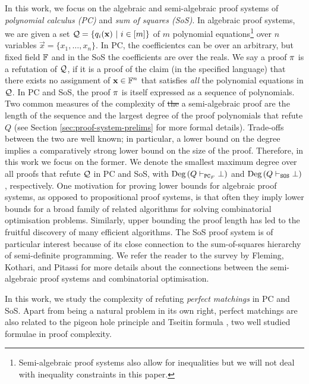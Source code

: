 \documentclass[11pt]{article}
\providecommand{\DIFadd}[1]{\textcolor{shin-ryoku}{#1}}%
\providecommand{\DIFdel}[1]{\textcolor{verylightgray}{\sout{#1}}}                      %
\providecommand{\DIFaddbegin}{} %
\providecommand{\DIFaddend}{} %
\providecommand{\DIFdelbegin}{} %
\providecommand{\DIFdelend}{} %
\begin{document}
In this work, we focus on the algebraic and semi-algebraic proof systems of \emph{polynomial calculus (PC)} and \emph{sum of squares (SoS)}. %
In algebraic proof systems, we are given a set $\mathcal{Q} =\{q_i(\mathbf{x}) \text{ } |\text{ } i \in [m] \}$ of $m$ polynomial equations\footnote{Semi-algebraic proof systems also allow for inequalities but we will not deal with inequality constraints in this paper.} over $n$ variables $\vec{x} = \{x_1, \dots, x_n\}$.
In PC, the coefficientcs can be over an arbitrary\DIFaddbegin \DIFadd{, but fixed }\DIFaddend field $\mathbb{F}$ and in the SoS the coefficients are  over the reals.
We say a proof $\pi$ is a refutation of $\mathcal{Q}$, if it is a proof of the claim (in the specified language) that there exists no assignment of $\mathbf{x} \in \mathbb{F}^n$ that satisfies \emph{all} the polynomial equations in $\mathcal{Q}$.
In PC and SoS, the proof $\pi$ is itself expressed as a sequence of polynomials.
Two common measures of the complexity of \DIFdelbegin \DIFdel{the }\DIFdelend \DIFaddbegin \DIFadd{a semi-algebraic }\DIFaddend proof are the length of the sequence and the largest degree of the proof polynomials that refute $Q$ (see Section \ref{sec:proof-system-prelims} for more formal details).
Trade-offs between the two are well known; in particular, a lower bound on the degree implies a comparatively strong lower bound on the size of the proof.
Therefore, in this work we focus on the former. We denote the smallest maximum degree over all proofs that refute $\mathcal{Q}$ in PC and SoS, with $\text{Deg}\left(Q \vdash_{\texttt{PC}_F} \bot\right)$ and $\text{Deg}\left(Q \vdash_{\texttt{SOS}} \bot\right)$, respectively.
One motivation for proving lower bounds for algebraic proof systems, as opposed to propositional proof systems, is that often they imply lower bounds for a broad family of related algorithms for solving combinatorial optimisation problems.
Similarly, upper bounding the proof length has led to the fruitful discovery of many efficient algorithms.
The SoS proof system is of particular interest because of its close connection to the sum-of-squares hierarchy of semi-definite programming.
We refer the reader to the survey by Fleming, Kothari, and Pitassi \cite{fleming2019semialgebraic} for more details about the connections between the semi-algebraic proof systems and combinatorial optimisation.\par
In this work, we study the complexity of refuting \emph{perfect matchings} in PC and SoS.
Apart from being a natural problem in its own right, perfect matchings are also related to the pigeon hole principle \citep{maciel2000new, pitassi1993exponential, raz2004resolution, razbarov2002pgp, razborov2003resolution} and Tseitin formula \citep{filmus2013towards, galesi2019bounded, glinskih2017satisfiable, grigoriev2001linear}, two well studied formulae in proof complexity.
\end{document}
